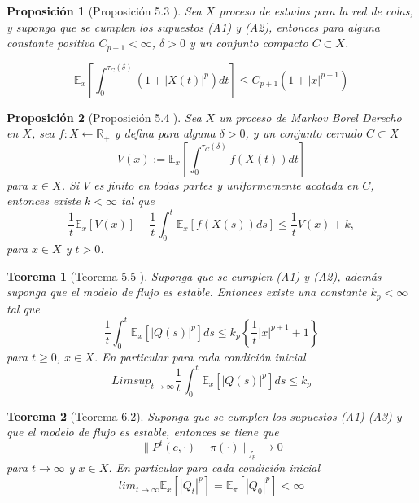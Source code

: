 \documentclass{article}
\newtheorem{Teo}{Teorema}
\newtheorem{Prop}{Proposición}
\newcommand{\rea}{\mathbb{R}}
\newcommand{\esp}{\mathbb{E}}
\begin{document}
\begin{Prop}[Proposici\'on 5.3 \cite{DaiSean}]
Sea $X$ proceso de estados para la red de colas, y suponga que se cumplen los supuestos (A1) y (A2), entonces para alguna constante positiva $C_{p+1}<\infty$, $\delta>0$ y un conjunto compacto $C\subset X$.

\begin{equation}\label{Eq.5.4}
\esp_{x}\left[\int_{0}^{\tau_{C}\left(\delta\right)}\left(1+|X\left(t\right)|^{p}\right)dt\right]\leq C_{p+1}\left(1+|x|^{p+1}\right)
\end{equation}
\end{Prop}

\begin{Prop}[Proposici\'on 5.4 \cite{DaiSean}]
Sea $X$ un proceso de Markov Borel Derecho en $X$, sea $f:X\leftarrow\rea_{+}$ y defina para alguna $\delta>0$, y un conjunto cerrado $C\subset X$
\[V\left(x\right):=\esp_{x}\left[\int_{0}^{\tau_{C}\left(\delta\right)}f\left(X\left(t\right)\right)dt\right]\]
para $x\in X$. Si $V$ es finito en todas partes y uniformemente acotada en $C$, entonces existe $k<\infty$ tal que
\begin{equation}\label{Eq.5.11}
\frac{1}{t}\esp_{x}\left[V\left(x\right)\right]+\frac{1}{t}\int_{0}^{t}\esp_{x}\left[f\left(X\left(s\right)\right)ds\right]\leq\frac{1}{t}V\left(x\right)+k,
\end{equation}
para $x\in X$ y $t>0$.
\end{Prop}


\begin{Teo}[Teorema 5.5 \cite{DaiSean}]
Suponga que se cumplen (A1) y (A2), adem\'as suponga que el modelo de flujo es estable. Entonces existe una constante $k_{p}<\infty$ tal que
\begin{equation}\label{Eq.5.13}
\frac{1}{t}\int_{0}^{t}\esp_{x}\left[|Q\left(s\right)|^{p}\right]ds\leq k_{p}\left\{\frac{1}{t}|x|^{p+1}+1\right\}
\end{equation}
para $t\geq0$, $x\in X$. En particular para cada condici\'on inicial
\begin{equation}\label{Eq.5.14}
Limsup_{t\rightarrow\infty}\frac{1}{t}\int_{0}^{t}\esp_{x}\left[|Q\left(s\right)|^{p}\right]ds\leq k_{p}
\end{equation}
\end{Teo}

\begin{Teo}[Teorema 6.2\cite{DaiSean}]\label{Tma.6.2}
Suponga que se cumplen los supuestos (A1)-(A3) y que el modelo de flujo es estable, entonces se tiene que
\[\parallel P^{t}\left(c,\cdot\right)-\pi\left(\cdot\right)\parallel_{f_{p}}\rightarrow0\]
para $t\rightarrow\infty$ y $x\in X$. En particular para cada condici\'on inicial \[lim_{t\rightarrow\infty}\esp_{x}\left[\left|Q_{t}\right|^{p}\right]=\esp_{\pi}\left[\left|Q_{0}\right|^{p}\right]<\infty\]
\end{Teo}
\end{document}
